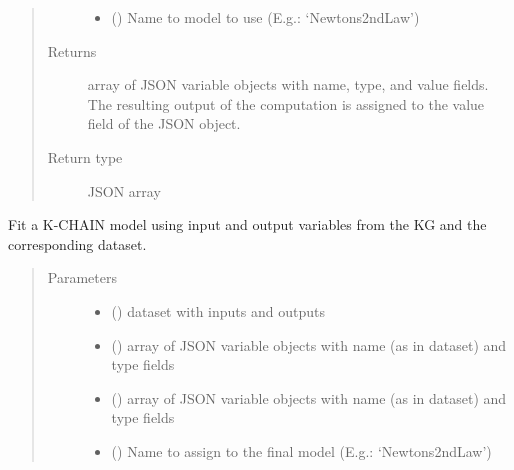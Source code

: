 \documentclass[letterpaper,10pt,english]{sphinxmanual}
\begin{document}
\begin{fulllineitems}
\begin{fulllineitems}
\begin{quote}
\begin{description}
\begin{itemize}
\item {} 
 () \textendash{} Name to model to use (E.g.: ‘Newtons2ndLaw’)

\end{itemize}

\item[{Returns}] \leavevmode
array of JSON variable objects with name, type, and value fields.
The resulting output of the computation is assigned to the value field of the JSON object.

\item[{Return type}] \leavevmode
JSON array

\end{description}\end{quote}

\end{fulllineitems}


\begin{fulllineitems}
\label{\detokenize{index:kChain.kChainModel.fitModel}}
Fit a K-CHAIN model using input and output variables from the KG and
the corresponding dataset.
\begin{quote}\begin{description}
\item[{Parameters}] \leavevmode\begin{itemize}
\item {} 
 () \textendash{} dataset with inputs and outputs

\item {} 
 () \textendash{} array of JSON variable objects with name (as in dataset) and type fields

\item {} 
 () \textendash{} array of JSON variable objects with name (as in dataset) and type fields

\item {} 
 () \textendash{} Name to assign to the final model (E.g.: ‘Newtons2ndLaw’)


\end{itemize}
\end{description}
\end{quote}
\end{fulllineitems}
\end{fulllineitems}
\end{document}

